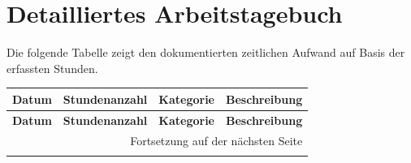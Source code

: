\section*{Detailliertes Arbeitstagebuch}

Die folgende Tabelle zeigt den dokumentierten zeitlichen Aufwand auf Basis der erfassten Stunden.

\small
\setlength{\LTleft}{0pt}
\setlength{\LTright}{0pt}
\begin{longtable}{|l|c|l|p{7.5cm}|}
\hline
\textbf{Datum} & \textbf{Stundenanzahl} & \textbf{Kategorie} & \textbf{Beschreibung} \\
\hline
\endfirsthead

\hline
\textbf{Datum} & \textbf{Stundenanzahl} & \textbf{Kategorie} & \textbf{Beschreibung} \\
\hline
\endhead

\hline
\multicolumn{4}{|r|}{\footnotesize Fortsetzung auf der nächsten Seite} \\
\hline
\endfoot

\hline
\endlastfoot


\end{longtable}
